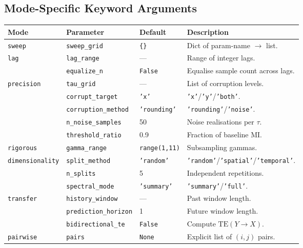 \documentclass[12pt]{article}
\newcommand{\api}[1]{\texttt{#1}}
\begin{document}
\subsection{Mode-Specific Keyword Arguments}

\begin{center}
\small
\begin{tabular}{lllp{7cm}}
\toprule
\textbf{Mode} & \textbf{Parameter} & \textbf{Default} & \textbf{Description} \\
\midrule
\api{sweep} & \api{sweep\_grid} & \api{\{\}} & Dict of param-name $\to$ list. \\
\api{lag} & \api{lag\_range} & — & Range of integer lags. \\
         & \api{equalize\_n} & \api{False} & Equalise sample count across lags. \\
\api{precision} & \api{tau\_grid} & — & List of corruption levels. \\
                & \api{corrupt\_target} & \api{'x'} & \api{'x'}/\api{'y'}/\api{'both'}. \\
                & \api{corruption\_method} & \api{'rounding'} & \api{'rounding'}/\api{'noise'}. \\
                & \api{n\_noise\_samples} & 50 & Noise realisations per $\tau$. \\
                & \api{threshold\_ratio} & 0.9 & Fraction of baseline MI. \\
\api{rigorous} & \api{gamma\_range} & \api{range(1,11)} & Subsampling gammas. \\
\api{dimensionality} & \api{split\_method} & \api{'random'} & \api{'random'}/\api{'spatial'}/\api{'temporal'}. \\
                     & \api{n\_splits} & 5 & Independent repetitions. \\
                     & \api{spectral\_mode} & \api{'summary'} & \api{'summary'}/\api{'full'}. \\
\api{transfer} & \api{history\_window} & — & Past window length. \\
               & \api{prediction\_horizon} & 1 & Future window length. \\
               & \api{bidirectional\_te} & \api{False} & Compute $\mathrm{TE}(Y\to X)$. \\
\api{pairwise} & \api{pairs} & \api{None} & Explicit list of $(i,j)$ pairs. \\
\bottomrule
\end{tabular}
\end{center}
\end{document}
